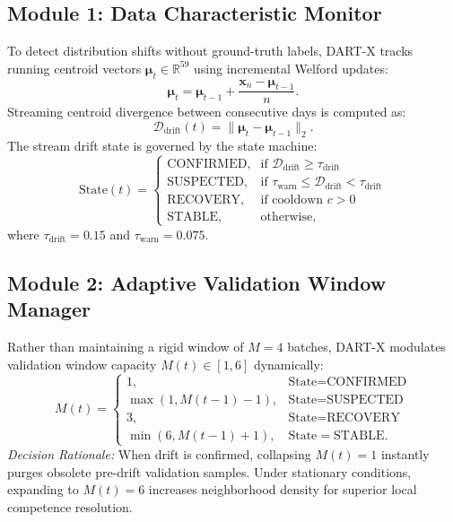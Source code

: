 \documentclass[conference,10pt]{IEEEtran}
\begin{document}
\subsection{Module 1: Data Characteristic Monitor}
To detect distribution shifts without ground-truth labels, DART-X tracks running centroid vectors $\boldsymbol{\mu}_t \in \mathbb{R}^{59}$ using incremental Welford updates:
\begin{equation}
    \boldsymbol{\mu}_{t} = \boldsymbol{\mu}_{t-1} + \frac{\mathbf{x}_n - \boldsymbol{\mu}_{t-1}}{n}.
\end{equation}
Streaming centroid divergence between consecutive days is computed as:
\begin{equation}
    \mathcal{D}_{\text{drift}}(t) = \|\boldsymbol{\mu}_t - \boldsymbol{\mu}_{t-1}\|_2.
\end{equation}
The stream drift state is governed by the state machine:
\begin{equation}
    \text{State}(t) = \begin{cases}
        \text{CONFIRMED}, & \text{if } \mathcal{D}_{\text{drift}} \ge \tau_{\text{drift}} \\
        \text{SUSPECTED}, & \text{if } \tau_{\text{warn}} \le \mathcal{D}_{\text{drift}} < \tau_{\text{drift}} \\
        \text{RECOVERY}, & \text{if cooldown } c > 0 \\
        \text{STABLE}, & \text{otherwise},
    \end{cases}
\end{equation}
where $\tau_{\text{drift}} = 0.15$ and $\tau_{\text{warn}} = 0.075$.

\subsection{Module 2: Adaptive Validation Window Manager}
Rather than maintaining a rigid window of $M = 4$ batches, DART-X modulates validation window capacity $M(t) \in [1, 6]$ dynamically:
\begin{equation}
    M(t) = \begin{cases}
        1, & \text{State} = \text{CONFIRMED} \\
        \max(1, M(t-1) - 1), & \text{State} = \text{SUSPECTED} \\
        3, & \text{State} = \text{RECOVERY} \\
        \min(6, M(t-1) + 1), & \text{State} = \text{STABLE}.
    \end{cases}
\end{equation}
\textit{Decision Rationale:} When drift is confirmed, collapsing $M(t) = 1$ instantly purges obsolete pre-drift validation samples. Under stationary conditions, expanding to $M(t) = 6$ increases neighborhood density for superior local competence resolution.
\end{document}
